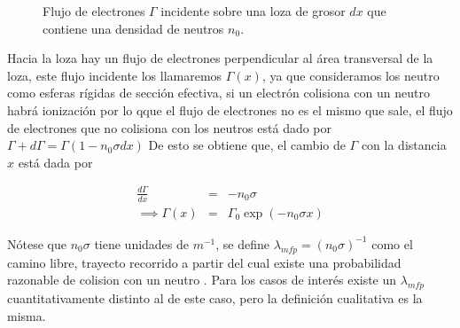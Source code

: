     \begin{figure}[hbt!]
 		\label{fig:slabdx}
 		\centering
 		\caption{Flujo de electrones $\Gamma$ incidente sobre una loza de grosor $dx$ que contiene una densidad de neutros $n_0$.}
 	\end{figure}

    Hacia la loza hay un flujo de electrones perpendicular al \'area transversal de la loza, este flujo incidente los llamaremos $\Gamma(x)$, ya que consideramos los neutro como esferas r\'igidas de secci\'on efectiva, si un electr\'on colisiona con un neutro habr\'a ionizaci\'on por lo qque el flujo de electrones no es el mismo que sale, el flujo de electrones que no colisiona con los neutros est\'a dado por $\Gamma + d\Gamma = \Gamma(1 - n_0\sigma dx)$ De esto se obtiene que, el cambio de $\Gamma$ con la distancia $x$ est\'a dada por 

    \begin{eqnarray}
      \frac{d\Gamma}{dx} &=& -n_0\sigma \nonumber\\
      \implies \Gamma(x) &=& \Gamma_0\exp{(-n_0\sigma x)} \nonumber
    \end{eqnarray}
  
    N\'otese que $n_0\sigma$ tiene unidades de $m^{-1}$, se define $\lambda_{mfp} = (n_0\sigma)^{-1}$ como el camino libre, trayecto recorrido a partir del cual existe una probabilidad razonable de colision con un neutro \cite{goldston1995}. Para los casos de inter\'es existe un $\lambda_{mfp}$ cuantitativamente distinto al de este caso, pero la definici\'on cualitativa es la misma.

